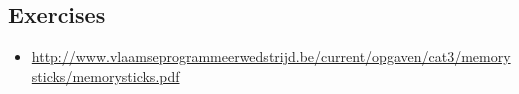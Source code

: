 \subsection{Exercises}
\begin{itemize}
 \item \url{http://www.vlaamseprogrammeerwedstrijd.be/current/opgaven/cat3/memorysticks/memorysticks.pdf}
\end{itemize}

